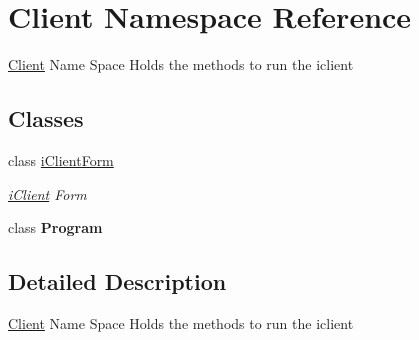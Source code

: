\hypertarget{namespace_client}{}\section{Client Namespace Reference}
\label{namespace_client}


\mbox{\hyperlink{namespace_client}{Client}} Name Space Holds the methods to run the iclient  


\subsection*{Classes}
\begin{DoxyCompactItemize}
\item 
class \mbox{\hyperlink{class_client_1_1i_client_form}{i\+Client\+Form}}
\begin{DoxyCompactList}\small\item\em \mbox{\hyperlink{namespacei_client}{i\+Client}} Form \end{DoxyCompactList}\item 
class {\bfseries Program}
\end{DoxyCompactItemize}


\subsection{Detailed Description}
\mbox{\hyperlink{namespace_client}{Client}} Name Space Holds the methods to run the iclient 

